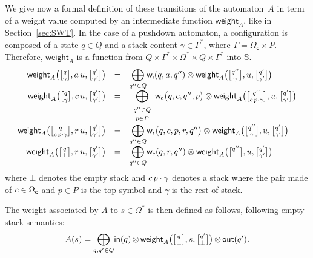 \documentclass[runningheads]{llncs}
\newcommand{\Semiring}{\mathbb{S}}
\def\weight{\mathsf{weight}}
\def\wei{\mathsf{w}}
\newcommand{\call}[1]{\ensuremath #1} %
\newcommand{\return}[1]{\ensuremath #1} %
\def\Omegac{{\Omega_\mathsf{c}}}
\def\weii{{\wei_\mathsf{i}}}
\def\weic{{\wei_\mathsf{c}}}
\def\weir{{\wei_\mathsf{r}}}
\def\weie{{\wei_\mathsf{e}}}
\newcommand{\config}[2]{\ensuremath \genfrac{[}{]}{0pt}{}{#1}{#2}}
\begin{document}
We give now a formal definition of these transitions of the automaton~$A$
in term of a weight value
computed by an intermediate function $\weight_A$, like in Section~\ref{sec:SWT}.
In the case of a pushdown automaton, a configuration is composed 
of a state $q \in Q$ and a stack content $\gamma \in \Gamma^*$, where $\Gamma = \Omegac \times P$.
Therefore, $\weight_A$ is a function from 
$Q \times \Gamma^* \times \Omega^* \times Q \times \Gamma^*$ into $\Semiring$.
\[
\begin{array}{rcl}
\weight_A\bigl(\config{q}{\gamma}, a\, u, \config{q'}{\gamma'}\bigr) & = & 
 {\displaystyle\bigoplus_{q'' \in Q}} \weii(q, a, q'') 
 \otimes \weight_A\bigl(\config{q''}{\gamma}, u, \config{q'}{\gamma'}\bigr)\\
%
\weight_A\bigl(\config{q}{\gamma}, {\call{c}}\, u, \config{q'}{\gamma'}\bigr) & = & 
 {\displaystyle\bigoplus_{\begin{array}{c}
                          \scriptstyle q'' \in Q\\[-2pt]
                          \scriptstyle p \in P
                          \end{array}}}
 \weic\bigl(q, {\call{c}}, q'', p\bigr) 
 \otimes \weight_A\bigl(\config{q''}{{\call{c}}\, p\cdot \gamma}, u, \config{q'}{\gamma'}\bigr)\\[1mm]
%
\weight_A\bigl(\config{q}{{\call{c}}\, p\cdot \gamma}, {\return{r}}\, u, \config{q'}{\gamma'}\bigr) & = & 
 {\displaystyle\bigoplus_{q'' \in Q}} 
 \weir\bigl(q, {\call{c}}, p, {\return{r}}, q''\bigr) 
 \otimes \weight_A\bigl(\config{q''}{\gamma}, u, \config{q'}{\gamma'}\bigr)\\
%
\weight_A\bigl(\config{q}{\bot}, {\return{r}}\, u, \config{q'}{\gamma'}\bigr) & = & 
 {\displaystyle\bigoplus_{q'' \in Q}} \weie(q, {\return{r}}, q'') 
 \otimes \weight_A\bigl(\config{q''}{\bot}, u, \config{q'}{\gamma'}\bigr)\\
\end{array}
\]
where $\bot$ denotes the empty stack and ${\call{c}}\, p\cdot \gamma$ 
denotes a stack where the pair made of ${\call{c}} \in \Omegac$ and $p \in P$ is the top symbol 
and $\gamma$ is the rest of stack.

\noindent
The weight associated by $A$ to $s \in \Omega^*$
is then defined as follows,
following empty stack semantics: 
\begin{equation}
A(s)  = 
{\displaystyle\bigoplus_{q, q' \in Q}} \textstyle
\mathsf{in}(q) \mathop{\otimes} 
\weight_A\bigl(\config{q}{\bot}, s, \config{q'}{\bot}\bigr) 
\mathop{\otimes} \mathsf{out}(q').
\label{eq:weightA}
\end{equation}
\end{document}

